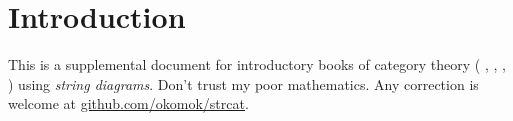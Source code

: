 \section{Introduction}


This is a supplemental document for introductory books of category theory %
(\cite{AdamekHerrlichStrecker200908}%
, \cite{Awodey201008}%
, \cite{Borceux200804}%
, \cite{Lane201011}%
) using \emph{string diagrams}. %
Don't trust my poor mathematics. Any correction is welcome at %
\href{https://github.com/okomok/strcat}{github.com/okomok/strcat}.  
